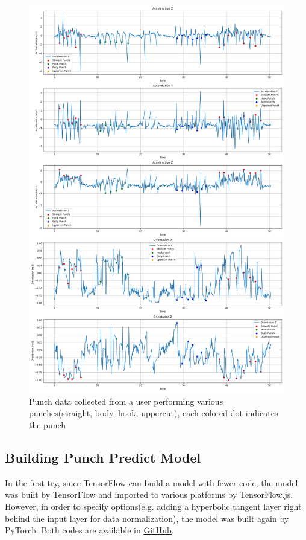 \documentclass{article}
\begin{document}
\FloatBarrier
\begin{figure}[h]
    \centering
    \includegraphics[height=0.9\textheight]{punch_data.png}
    \caption{Punch data collected from a user performing various punches(straight, body, hook, uppercut), each colored dot indicates the punch}
    \label{fig:punch_data}
\end{figure}







\FloatBarrier
\subsection{Building Punch Predict Model}

In the first try, since TensorFlow can build a model with fewer code, the model was built by TensorFlow and imported to various platforms by TensorFlow.js. However, in order to specify options(e.g. adding a hyperbolic tangent layer right behind the input layer for data normalization), the model was built again by PyTorch. Both codes are available in \href{https://github.com/punch-boxing/punch-ml/}{GitHub}.
\end{document}
